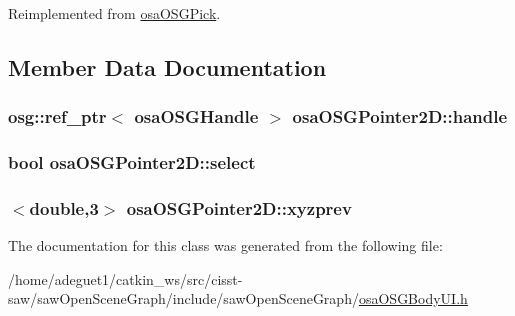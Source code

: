 Reimplemented from \hyperlink{classosa_o_s_g_pick_a94f0070f479012ffa3c5717c617072c9}{osa\-O\-S\-G\-Pick}.



\subsection{Member Data Documentation}
\hypertarget{classosa_o_s_g_pointer2_d_a84c0eeeb907fe3c630ef982cbe51d34a}{
\subsubsection[{handle}]{\setlength{\rightskip}{0pt plus 5cm}osg\-::ref\-\_\-ptr$<$ {\bf osa\-O\-S\-G\-Handle} $>$ osa\-O\-S\-G\-Pointer2\-D\-::handle\hspace{0.3cm}{\ttfamily [protected]}}}\label{classosa_o_s_g_pointer2_d_a84c0eeeb907fe3c630ef982cbe51d34a}
\hypertarget{classosa_o_s_g_pointer2_d_a4f98fd27df2ef100b7bd58673b2578de}{
\subsubsection[{select}]{\setlength{\rightskip}{0pt plus 5cm}bool osa\-O\-S\-G\-Pointer2\-D\-::select\hspace{0.3cm}{\ttfamily [protected]}}}\label{classosa_o_s_g_pointer2_d_a4f98fd27df2ef100b7bd58673b2578de}
\hypertarget{classosa_o_s_g_pointer2_d_a182ee22feed750daa7d6ee2850e39631}{
\subsubsection[{xyzprev}]{$<$double,3$>$ osa\-O\-S\-G\-Pointer2\-D\-::xyzprev\hspace{0.3cm}{\ttfamily [protected]}}}\label{classosa_o_s_g_pointer2_d_a182ee22feed750daa7d6ee2850e39631}


The documentation for this class was generated from the following file\-:\begin{DoxyCompactItemize}
\item 
/home/adeguet1/catkin\-\_\-ws/src/cisst-\/saw/saw\-Open\-Scene\-Graph/include/saw\-Open\-Scene\-Graph/\hyperlink{osa_o_s_g_body_u_i_8h}{osa\-O\-S\-G\-Body\-U\-I.\-h}\end{DoxyCompactItemize}
